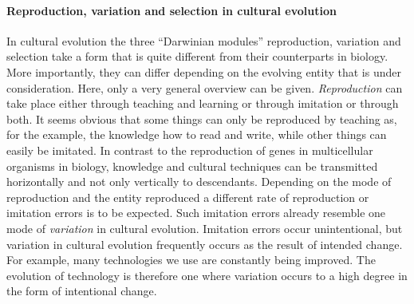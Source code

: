 \paragraph{Reproduction, variation and selection in cultural evolution}

\label{reproductionInCulturalEvolution} In cultural evolution the three
``Darwinian modules'' reproduction, variation and selection take a form that
is quite different from their counterparts in biology. More importantly, they
can differ depending on the evolving entity that is under consideration. Here,
only a very general overview can be given. {\em Reproduction} can take place
either through teaching and learning or through imitation or through both. It
seems obvious that some things can only be reproduced by teaching as, for the
example, the knowledge how to read and write, while other things can easily be
imitated. In contrast to the reproduction of genes in multicellular organisms
in biology, knowledge and cultural techniques can be transmitted horizontally
and not only vertically to descendants. Depending on the mode of reproduction
and the entity reproduced a different rate of reproduction or imitation errors
is to be expected. Such imitation errors already resemble one mode of {\em
  variation} in cultural evolution. Imitation errors occur unintentional, but
variation in cultural evolution frequently occurs as the result of intended
change. For example, many technologies we use are constantly being improved.
The evolution of technology is therefore one where variation occurs to a high
degree in the form of intentional change.

